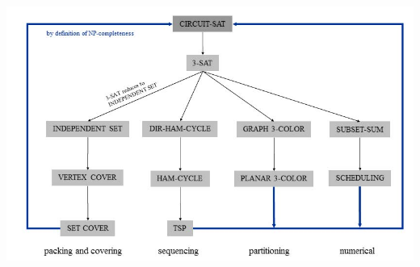 \documentclass[a4paper]{article}
\begin{document}
\begin{multicols}{2}
\begin{tcolorbox}[title=NP Reduction]
    \includegraphics[width=\textwidth]{NPReduction.jpg}

\end{tcolorbox}

\end{multicols}
\end{document}
